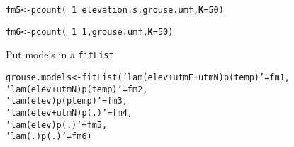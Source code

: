 \documentclass[color=usenames,dvipsnames]{beamer}\usepackage[]{graphicx}\usepackage[]{color}
\makeatletter
\newcommand{\hlnum}[1]{\textcolor[rgb]{0.69,0.494,0}{#1}}%
\newcommand{\hlstr}[1]{\textcolor[rgb]{0.749,0.012,0.012}{#1}}%
\newcommand{\hlopt}[1]{\textcolor[rgb]{0,0,0}{#1}}%
\newcommand{\hlstd}[1]{\textcolor[rgb]{0,0,0}{#1}}%
\newcommand{\hlkwb}[1]{\textcolor[rgb]{0,0.341,0.682}{#1}}%
\newcommand{\hlkwc}[1]{\textcolor[rgb]{0,0,0}{\textbf{#1}}}%
\newcommand{\hlkwd}[1]{\textcolor[rgb]{0.004,0.004,0.506}{#1}}%
\newenvironment{kframe}{%
 \def\at@end@of@kframe{}%
 \ifinner\ifhmode%
  \def\at@end@of@kframe{\end{minipage}}%
  \begin{minipage}{\columnwidth}%
 \fi\fi%
 \def\FrameCommand##1{\hskip\@totalleftmargin \hskip-\fboxsep
 \colorbox{shadecolor}{##1}\hskip-\fboxsep
     \hskip-\linewidth \hskip-\@totalleftmargin \hskip\columnwidth}%
 \MakeFramed {\advance\hsize-\width
   \@totalleftmargin\z@ \linewidth\hsize
   \@setminipage}}%
 {\par\unskip\endMakeFramed%
 \at@end@of@kframe}
\newenvironment{knitrout}{}{} %
\newcommand{\inr}[1]{\colorbox{inlinecolor}{\texttt{#1}}}
\makeatother
\begin{document}
\begin{frame}[fragile]
\begin{knitrout}
\begin{kframe}
{\ttfamily\noindent\bfseries{}}\begin{alltt}
\hlstd{fm5} \hlkwb{<-} \hlkwd{pcount}\hlstd{(}\hlopt{~}\hlnum{1} \hlopt{~} \hlstd{elevation.s, grouse.umf,} \hlkwc{K}\hlstd{=}\hlnum{50}\hlstd{)}
\end{alltt}


{\ttfamily\noindent\bfseries{}}\begin{alltt}
\hlstd{fm6} \hlkwb{<-} \hlkwd{pcount}\hlstd{(}\hlopt{~}\hlnum{1} \hlopt{~} \hlnum{1}\hlstd{, grouse.umf,} \hlkwc{K}\hlstd{=}\hlnum{50}\hlstd{)}
\end{alltt}


{\ttfamily\noindent\bfseries{}}\end{kframe}
\end{knitrout}
\pause
\vfill
Put models in a \inr{fitList}
  \vspace{-6pt}
\begin{knitrout}\scriptsize
{}\color{fgcolor}\begin{kframe}
\begin{alltt}
\hlstd{grouse.models} \hlkwb{<-} \hlkwd{fitList}\hlstd{(}\hlstr{'lam(elev+utmE+utmN)p(temp)'}\hlstd{=fm1,}
                         \hlstr{'lam(elev+utmN)p(temp)'}\hlstd{=fm2,}
                         \hlstr{'lam(elev)p(ptemp)'}\hlstd{=fm3,}
                         \hlstr{'lam(elev+utmN)p(.)'}\hlstd{=fm4,}
                         \hlstr{'lam(elev)p(.)'}\hlstd{=fm5,}
                         \hlstr{'lam(.)p(.)'}\hlstd{=fm6)}
\end{alltt}
\end{kframe}
\end{knitrout}
\end{frame}
\end{document}
